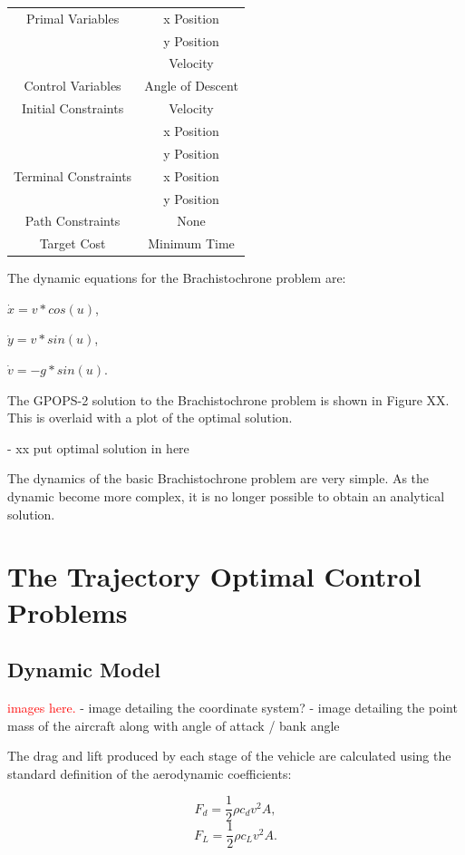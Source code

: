 \begin{tabular}{|c|c|}
	\hline Primal Variables  & x Position\\& y Position\\& Velocity\\ 
	\hline Control Variables  & Angle of Descent\\ 
	\hline Initial Constraints  & Velocity\\ & x Position\\ & y Position\\
	\hline Terminal Constraints &  x Position\\ & y Position\\
	\hline Path Constraints & None \\ 
	\hline Target Cost & Minimum Time \\ 
	\hline 
\end{tabular} 

The dynamic equations for the Brachistochrone problem are:

$\dot{x} = v*cos(u)$,

$\dot{y} = v*sin(u)$,

$\dot{v} = -g*sin(u)$.

The GPOPS-2 solution to the Brachistochrone problem is shown in Figure XX. This is overlaid with a plot of the optimal solution.

- xx put optimal solution in here 

The dynamics of the basic Brachistochrone problem are very simple. As the dynamic become more complex, it is no longer possible to obtain an analytical solution. 

\section{The Trajectory Optimal Control Problems}

\subsection{Dynamic Model}

 \textcolor{red}{images here.}
 - image detailing the coordinate system?
 - image detailing the point mass of the aircraft along with angle of attack / bank angle

The drag and lift produced by each stage of the vehicle are calculated using the standard definition of the aerodynamic coefficients:

\begin{equation}
F_d = \frac{1}{2}\rho c_d v^2 A ,
\end{equation}
\begin{equation}
F_L = \frac{1}{2}\rho c_L v^2 A .
\end{equation}

